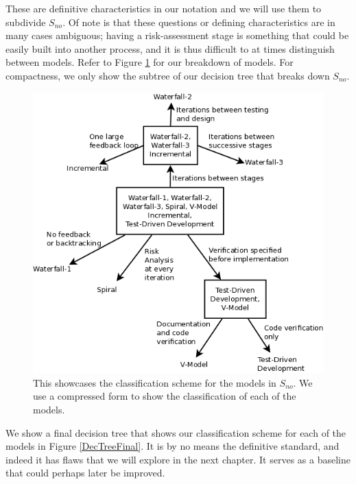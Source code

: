 These are definitive characteristics in our notation and we will use them to
subdivide $S_{no}$.
Of note is that these questions or defining characteristics are in many cases
ambiguous; having a risk-assessment stage is something that could be easily
built into another process, and it is thus difficult to at times distinguish
between models.
Refer to Figure \ref{DecTree4} for our breakdown of models.
For compactness, we only show the subtree of our decision tree that breaks down
$S_{no}$.

\begin{figure}[ht!]
  \includegraphics[scale=0.4]{media/DecisionTree4}
  \caption{This showcases the classification scheme for the models in $S_{no}$.
  We use a compressed form to show the classification of each of the models.}
  \label{DecTree4}
\end{figure}

We show a final decision tree that shows our classification scheme for each of
the models in Figure \ref{DecTreeFinal}.
It is by no means the definitive standard, and indeed it has flaws that we will
explore in the next chapter.
It serves as a baseline that could perhaps later be improved.

